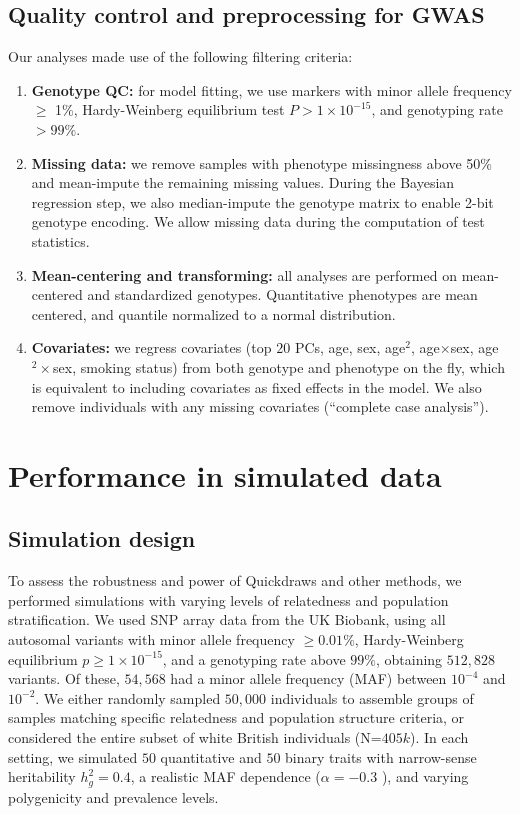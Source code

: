 \subsection{Quality control and preprocessing for GWAS}
Our analyses made use of the following filtering criteria:
\begin{enumerate}
    \item \textbf{Genotype QC:} for model fitting, we use markers with minor allele frequency $\geq$ 1\%, Hardy-Weinberg equilibrium test $P > 1 \times 10^{-15}$, and genotyping rate $> 99\%$. 
    \item \textbf{Missing data:} we remove samples with phenotype missingness above 50\% and mean-impute the remaining missing values.
    During the Bayesian regression step, we also median-impute the genotype matrix to enable 2-bit genotype encoding. We allow missing data during the computation of test statistics.
    \item \textbf{Mean-centering and transforming:} all analyses are performed on mean-centered and standardized genotypes.
    Quantitative phenotypes are mean centered, and quantile normalized to a normal distribution.
    \item \textbf{Covariates:} we regress covariates (top $20$ PCs, age, sex, age$^2$, age$\times$sex, age$^2\times$sex, smoking status) from both genotype and phenotype on the fly, which is equivalent to including covariates as fixed effects in the model.
    We also remove individuals with any missing covariates (``complete case analysis'').
\end{enumerate}

\section{Performance in simulated data}
\label{sec:ch5-sim}

\subsection{Simulation design}
\label{sec:ch5-sim-design}
To assess the robustness and power of Quickdraws and other methods, we performed simulations with varying levels of relatedness and population stratification.
%
We used SNP array data from the UK Biobank, using all autosomal variants with minor allele frequency $\geq 0.01\%$, Hardy-Weinberg equilibrium $p \geq 1 \times 10^{-15}$, and a genotyping rate above $99\%$, obtaining $512,828$ variants.
%
Of these, $54{,}568$ had a minor allele frequency (MAF) between $10^{-4}$ and $10^{-2}$.
%
We either randomly sampled $50{,}000$ individuals to assemble groups of samples matching specific relatedness and population structure criteria, or considered the entire subset of white British individuals (N=$405k$).
%
In each setting, we simulated $50$ quantitative and $50$ binary traits with narrow-sense heritability $h_g^2 = 0.4$, a realistic MAF dependence ($\alpha = -0.3$ \cite{zeng2018signatures,schoech2019quantification}), and varying polygenicity and prevalence levels.
%


